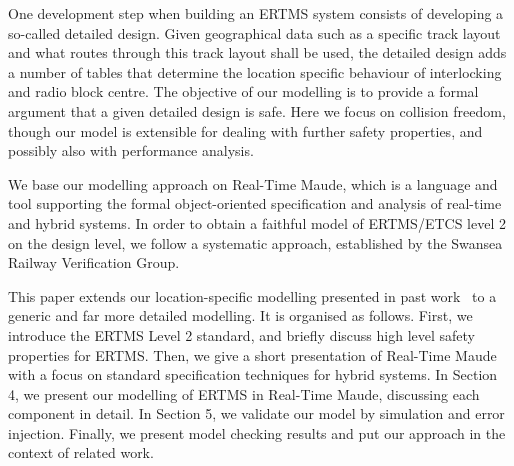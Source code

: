 One development step when building an ERTMS system consists of
developing a so-called detailed design. Given geographical data such
as a specific track layout and what routes through this track layout
shall be used, the detailed design adds a number of tables that
determine the location specific behaviour of interlocking and radio
block centre. The objective of our modelling is to provide a formal
argument that a given detailed design is safe. Here we focus on
collision freedom, though our model is extensible for dealing with
further safety properties, and possibly also with performance
analysis.

We base our modelling approach on Real-Time Maude, which is a language
and tool supporting the formal object-oriented specification and
analysis of real-time and hybrid systems. In order to obtain a faithful model of
ERTMS/ETCS level 2 on the design level, we follow a systematic
approach, established by the Swansea Railway Verification
Group.

This paper extends our location-specific modelling presented in past work~\cite{old} to a generic and far more detailed modelling. It is
organised as follows. First, we introduce the ERTMS Level 2 standard,
and briefly discuss high level safety properties for ERTMS. Then, we
give a short presentation of Real-Time Maude with a focus on standard
specification techniques for hybrid systems. In Section 4, we present
our modelling of ERTMS in Real-Time Maude, discussing each component
in detail. In Section 5, we validate our model by simulation and
error injection. Finally, we present model checking results and put
our approach in the context of related work.

